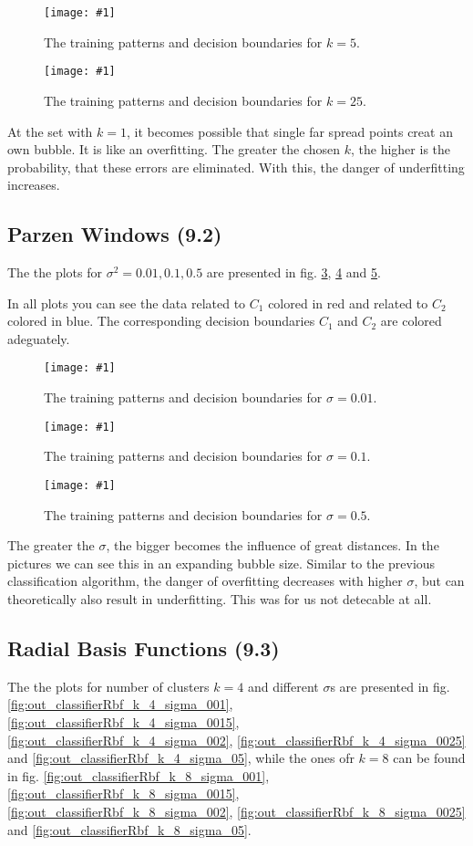 \documentclass[a4paper,headings=small]{scrartcl}
\newcommand{\image}[3]{
\begin{figure}[htbp]
\centering
\texttt{[image: \#1]}
\caption{#3}
\label{fig:#1}
\end{figure}
}
\begin{document}
\image{out_classifierKnn_k_5}{\classifierPlotWidth}%
	{The training patterns and decision boundaries for $k = 5$.}

\image{out_classifierKnn_k_25}{\classifierPlotWidth}%
	{The training patterns and decision boundaries for $k = 25$.}

At the set with $k = 1$, it becomes possible that single far spread points creat an own bubble.
It is like an overfitting. The greater the chosen $k$, the higher is the probability, that these errors are eliminated.
With this, the danger of underfitting increases.


\subsection{Parzen Windows (9.2)}
The the plots for $\sigma^2 = 0.01, 0.1, 0.5$ are presented in fig.
\ref{fig:out_classifierParzen_sigma2_001},
\ref{fig:out_classifierParzen_sigma2_01} and
\ref{fig:out_classifierParzen_sigma2_05}.

In all plots you can see the data related to $C_1$ colored in red and related to $C_2$ colored in blue.
The corresponding decision boundaries $C_1$ and $C_2$ are colored adeguately.

\image{out_classifierParzen_sigma2_001}{\classifierPlotWidth}%
	{The training patterns and decision boundaries for $\sigma = 0.01$.}

\image{out_classifierParzen_sigma2_01}{\classifierPlotWidth}%
	{The training patterns and decision boundaries for $\sigma = 0.1$.}

\image{out_classifierParzen_sigma2_05}{\classifierPlotWidth}%
	{The training patterns and decision boundaries for $\sigma = 0.5$.}

The greater the $\sigma$, the bigger becomes the influence of great distances.
In the pictures we can see this in an expanding bubble size.
Similar to the previous classification algorithm, the danger of overfitting decreases with higher $\sigma$,
but can theoretically also result in underfitting.
This was for us not detecable at all.


\subsection{Radial Basis Functions (9.3)}
The the plots for number of clusters $k = 4$ and different $\sigma$s are presented in fig.
\ref{fig:out_classifierRbf_k_4_sigma_001},
\ref{fig:out_classifierRbf_k_4_sigma_0015},
\ref{fig:out_classifierRbf_k_4_sigma_002},
\ref{fig:out_classifierRbf_k_4_sigma_0025} and
\ref{fig:out_classifierRbf_k_4_sigma_05},
while the ones ofr $k = 8$ can be found in fig.
\ref{fig:out_classifierRbf_k_8_sigma_001},
\ref{fig:out_classifierRbf_k_8_sigma_0015},
\ref{fig:out_classifierRbf_k_8_sigma_002},
\ref{fig:out_classifierRbf_k_8_sigma_0025} and
\ref{fig:out_classifierRbf_k_8_sigma_05}.
\end{document}
